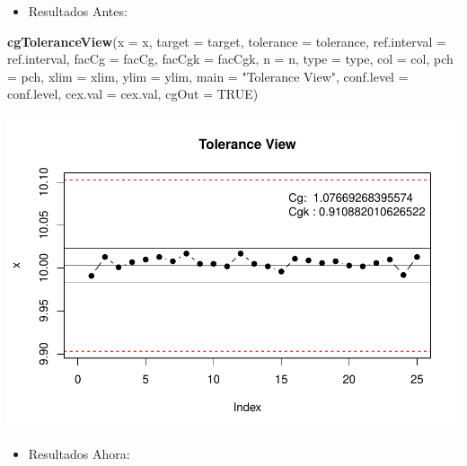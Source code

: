 \documentclass[
]{book}
\newenvironment{Shaded}{\begin{snugshade}}{\end{snugshade}}
\newcommand{\AttributeTok}[1]{\textcolor[rgb]{0.13,0.29,0.53}{#1}}
\newcommand{\ConstantTok}[1]{\textcolor[rgb]{0.56,0.35,0.01}{#1}}
\newcommand{\FunctionTok}[1]{\textcolor[rgb]{0.13,0.29,0.53}{\textbf{#1}}}
\newcommand{\NormalTok}[1]{#1}
\newcommand{\StringTok}[1]{\textcolor[rgb]{0.31,0.60,0.02}{#1}}
\providecommand{\tightlist}{%
  \setlength{\itemsep}{0pt}\setlength{\parskip}{0pt}}
\begin{document}
\begin{itemize}
\tightlist
\item
  Resultados Antes:
\end{itemize}

\begin{Shaded}
\begin{Highlighting}[]
\FunctionTok{cgToleranceView}\NormalTok{(}\AttributeTok{x =}\NormalTok{ x, }\AttributeTok{target =}\NormalTok{ target, }\AttributeTok{tolerance =}\NormalTok{ tolerance, }
                \AttributeTok{ref.interval =}\NormalTok{ ref.interval, }\AttributeTok{facCg =}\NormalTok{ facCg, }\AttributeTok{facCgk =}\NormalTok{ facCgk, }
                \AttributeTok{n =}\NormalTok{ n, }\AttributeTok{type =}\NormalTok{ type, }\AttributeTok{col =}\NormalTok{ col, }\AttributeTok{pch =}\NormalTok{ pch, }\AttributeTok{xlim =}\NormalTok{ xlim, }
                \AttributeTok{ylim =}\NormalTok{ ylim, }\AttributeTok{main =} \StringTok{"Tolerance View"}\NormalTok{, }\AttributeTok{conf.level =}\NormalTok{ conf.level, }
                \AttributeTok{cex.val =}\NormalTok{ cex.val, }\AttributeTok{cgOut =} \ConstantTok{TRUE}\NormalTok{)}
\end{Highlighting}
\end{Shaded}

\includegraphics{Libro_TidyQualityTools_files/figure-latex/unnamed-chunk-146-1.pdf}

\begin{itemize}
\tightlist
\item
  Resultados Ahora:
\end{itemize}
\end{document}

